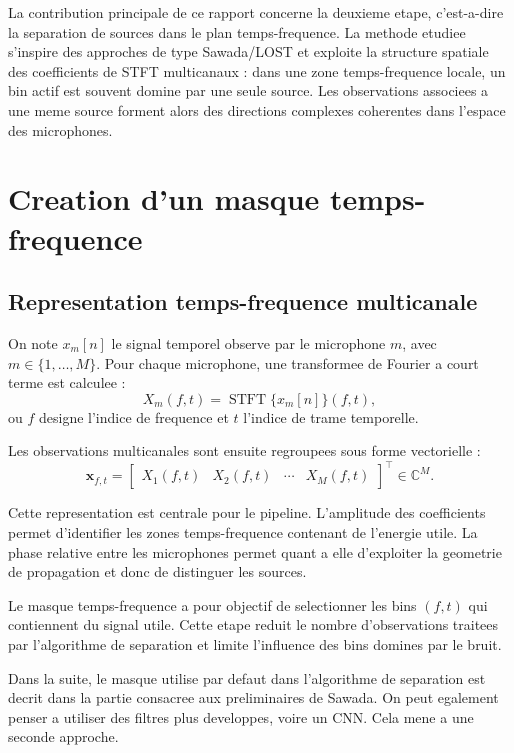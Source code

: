 \documentclass[11pt,a4paper]{article}
\newcommand{\STFT}{\operatorname{STFT}}
\begin{document}
La contribution principale de ce rapport concerne la deuxieme etape, c'est-a-dire
la separation de sources dans le plan temps-frequence. La methode etudiee
s'inspire des approches de type Sawada/LOST et exploite la structure spatiale
des coefficients de STFT multicanaux : dans une zone temps-frequence locale, un
bin actif est souvent domine par une seule source. Les observations associees a
une meme source forment alors des directions complexes coherentes dans l'espace
des microphones.

\section{Creation d'un masque temps-frequence}
\subsection{Representation temps-frequence multicanale}

On note $x_m[n]$ le signal temporel observe par le microphone $m$, avec
$m \in \{1,\dots,M\}$. Pour chaque microphone, une transformee de Fourier a
court terme est calculee :
\[
  X_m(f,t) = \STFT\{x_m[n]\}(f,t),
  \]
  ou $f$ designe l'indice de frequence et $t$ l'indice de trame temporelle.
  
  Les observations multicanales sont ensuite regroupees sous forme vectorielle :
  \[
    \mathbf{x}_{f,t}
    =
    \begin{bmatrix}
      X_1(f,t) & X_2(f,t) & \cdots & X_M(f,t)
    \end{bmatrix}^{\top}
    \in \mathbb{C}^{M}.
\]

Cette representation est centrale pour le pipeline. L'amplitude des
coefficients permet d'identifier les zones temps-frequence contenant de
l'energie utile. La phase relative entre les microphones permet quant a elle
d'exploiter la geometrie de propagation et donc de distinguer les sources.



Le masque temps-frequence a pour objectif de selectionner les bins $(f,t)$ qui
contiennent du signal utile. Cette etape reduit le nombre d'observations
traitees par l'algorithme de separation et limite l'influence des bins domines
par le bruit.



Dans la suite, le masque utilise par defaut dans l'algorithme de separation est
decrit dans la partie consacree aux preliminaires de Sawada. On peut egalement
penser a utiliser des filtres plus developpes, voire un CNN. Cela mene a une
seconde approche.
\end{document}
